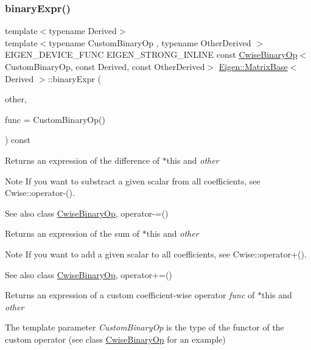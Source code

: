 \subsubsection{\texorpdfstring{binaryExpr()}{binaryExpr()}}
{\footnotesize\ttfamily template$<$typename Derived$>$ \\
template$<$typename Custom\+Binary\+Op , typename Other\+Derived $>$ \\
E\+I\+G\+E\+N\+\_\+\+D\+E\+V\+I\+C\+E\+\_\+\+F\+U\+NC E\+I\+G\+E\+N\+\_\+\+S\+T\+R\+O\+N\+G\+\_\+\+I\+N\+L\+I\+NE const \mbox{\hyperlink{class_eigen_1_1_cwise_binary_op}{Cwise\+Binary\+Op}}$<$Custom\+Binary\+Op, const Derived, const Other\+Derived$>$ \mbox{\hyperlink{class_eigen_1_1_matrix_base}{Eigen\+::\+Matrix\+Base}}$<$ Derived $>$\+::binary\+Expr (\begin{DoxyParamCaption}\item[{const E\+I\+G\+E\+N\+\_\+\+C\+U\+R\+R\+E\+N\+T\+\_\+\+S\+T\+O\+R\+A\+G\+E\+\_\+\+B\+A\+S\+E\+\_\+\+C\+L\+A\+SS$<$ Other\+Derived $>$ \&}]{other,  }\item[{const Custom\+Binary\+Op \&}]{func = {\ttfamily CustomBinaryOp()} }\end{DoxyParamCaption}) const\hspace{0.3cm}{\ttfamily [inline]}}

\begin{DoxyReturn}{Returns}
an expression of the difference of {\ttfamily $\ast$this} and {\itshape other} 
\end{DoxyReturn}
\begin{DoxyNote}{Note}
If you want to substract a given scalar from all coefficients, see Cwise\+::operator-\/().
\end{DoxyNote}
\begin{DoxySeeAlso}{See also}
class \mbox{\hyperlink{class_eigen_1_1_cwise_binary_op}{Cwise\+Binary\+Op}}, operator-\/=()
\end{DoxySeeAlso}
\begin{DoxyReturn}{Returns}
an expression of the sum of {\ttfamily $\ast$this} and {\itshape other} 
\end{DoxyReturn}
\begin{DoxyNote}{Note}
If you want to add a given scalar to all coefficients, see Cwise\+::operator+().
\end{DoxyNote}
\begin{DoxySeeAlso}{See also}
class \mbox{\hyperlink{class_eigen_1_1_cwise_binary_op}{Cwise\+Binary\+Op}}, operator+=()
\end{DoxySeeAlso}
\begin{DoxyReturn}{Returns}
an expression of a custom coefficient-\/wise operator {\itshape func} of $\ast$this and {\itshape other} 
\end{DoxyReturn}
The template parameter {\itshape Custom\+Binary\+Op} is the type of the functor of the custom operator (see class \mbox{\hyperlink{class_eigen_1_1_cwise_binary_op}{Cwise\+Binary\+Op}} for an example)

